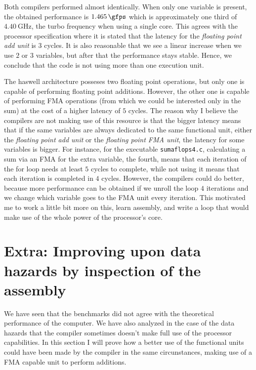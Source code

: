 \documentclass[
    12pt, %
]{fphw}
\newcommand{\tech}{\texttt}
\begin{document}
    Both compilers performed almost identically.
When only one variable is present, the obtained performance is $\SI{1.465}{\gfps}$
which is approximately one third of $\SI{4.40}{\GHz}$,
the turbo frequency when using a single core.
This agrees with the processor specification where it is stated that the latency
for the \textit{floating point add unit} is $3$ cycles.
It is also reasonable that we see a linear increase when we use $2$ or $3$ variables,
but after that the performance stays stable.
Hence, we conclude that the code is not using more than one execution unit.

    The haswell architecture posseses two floating point operations,
but only one is capable of performing floating point additions.
However, the other one is capable of performing FMA operations
(from which we could be interested only in the sum)
at the cost of a higher latency of $5$ cycles.
The reason why I believe the compilers are not making use of this resource
is that the bigger latency means that if the same variables are always dedicated
to the same functional unit,
either the \textit{floating point add unit} or the \textit{floating point FMA unit},
the latency for some variables is bigger.
For instance, for the executable \tech{sumaflops4.c},
calculating a sum via an FMA for the extra variable, the fourth,
means that each iteration of the for loop needs at least $5$ cycles to complete,
while not using it means that each iteration is completed in $4$ cycles.
However, the compilers could do better, because more performance can be obtained
if we unroll the loop $4$ iterations and
we change which variable goes to the FMA unit every iteration.
This motivated me to work a little bit more on this,
learn assembly,
and write a loop that would make use of the whole power of the processor's core.

\section{Extra: Improving upon data hazards by inspection of the assembly}

    We have seen that the benchmarks did not agree with the
theoretical performance of the computer.
We have also analyzed in the case of the data hazards that the compiler sometimes
doesn't make full use of the processor capabilities.
In this section I will prove how a better use of the functional units could have
been made by the compiler in the same circunstances,
making use of a FMA capable unit to perform additions.
\end{document}
